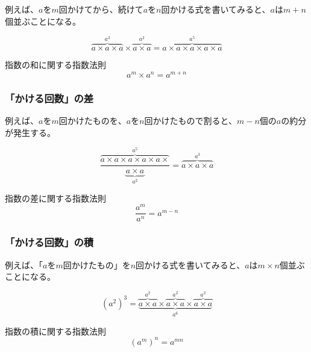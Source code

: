 \documentclass[../math-imaging]{subfiles}
\begin{document}
例えば、$a$を$m$回かけてから、続けて$a$を$n$回かける式を書いてみると、$a$は$m+n$個並ぶことになる。

\begin{equation}
  \overbrace{a\times a\times a}^{a^3} \times \overbrace{a\times a}^{a^2} = \overbrace{a\times a\times a\times a\times a}^{a^5}
\end{equation}

\begin{theorem}{指数の和に関する指数法則}
  \LARGE
  \begin{equation}
    a^m \times a^n = a^{m+n}
  \end{equation}
\end{theorem}

\subsubsection{「かける回数」の差}

例えば、$a$を$m$回かけたものを、$a$を$n$回かけたもので割ると、$m-n$個の$a$の約分が発生する。

\begin{equation}
  \dfrac{\overbrace{a\times a\times a\times a\times a\times}^{a^5}}{\underbrace{a\times a}_{a^2}} = \overbrace{a\times a\times a}^{a^3}
\end{equation}

\begin{theorem}{指数の差に関する指数法則}
  \LARGE
  \begin{equation}
    \dfrac{a^m}{a^n} = a^{m-n}
  \end{equation}
\end{theorem}

\subsubsection{「かける回数」の積}

例えば、「$a$を$m$回かけたもの」を$n$回かける式を書いてみると、$a$は$m \times n$個並ぶことになる。

\begin{equation}
  (a^2)^3 = \underbrace{\overbrace{a\times a}^{a^2} \times \overbrace{a\times a}^{a^2} \times \overbrace{a\times a}^{a^2}}_{a^6}
\end{equation}

\begin{theorem}{指数の積に関する指数法則}
  \LARGE
  \begin{equation}
    (a^m)^n = a^{mn}
  \end{equation}
\end{theorem}
\end{document}
